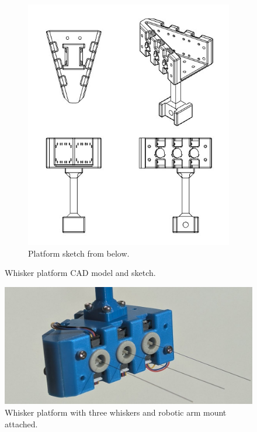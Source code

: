 \begin{figure}[ht]
\begin{subfigure}[b]{0.45\textwidth}
        \includegraphics[height=0.3\textheight]{figures/platform-sketch}
        \caption{Platform sketch from below.}
    \end{subfigure}
    \caption{Whisker platform CAD model and sketch.}
    \label{fig:platform}
\end{figure}

\begin{figure}[htb]
    \centering
    \includegraphics[width=0.6\textheight]{figures/platform}
    \caption{Whisker platform with three whiskers and robotic arm mount attached.}
    \label{fig:whisker_platform}
\end{figure}


